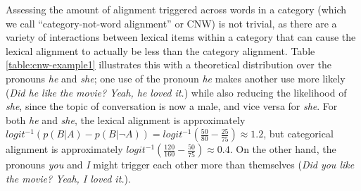 \documentclass[11pt]{article}
\begin{document}
Assessing the amount of alignment triggered across words in a category (which we call ``category-not-word alignment'' or CNW) is not trivial, as there are a variety of interactions between lexical items within a category that can cause the lexical alignment to actually be less than the category alignment. Table \ref{table:cnw-example1} illustrates this with a theoretical distribution over the pronouns \textit{he} and \textit{she}; one use of the pronoun \textit{he} makes another use more likely (\textit{Did he like the movie? Yeah, he loved it.}) while also reducing the likelihood of \textit{she}, since the topic of conversation is now a male, and vice versa for \textit{she}. For both \textit{he} and \textit{she}, the lexical alignment is approximately $logit^{-1}(p(B|A)-p(B|\neg A)) = logit^{-1}(\frac{50}{80}-\frac{25}{75}) \approx 1.2$,
but categorical alignment is approximately $logit^{-1}(\frac{120}{160}-\frac{50}{75}) \approx 0.4$. On the other hand, the pronouns \textit{you} and \textit{I} might trigger each other more than themselves (\textit{Did you like the movie? Yeah, I loved it.}).





\end{document}
